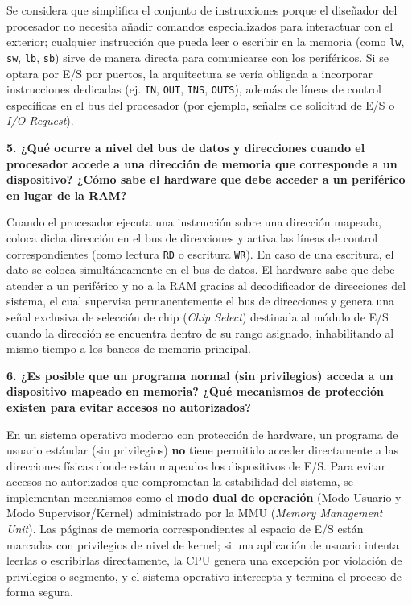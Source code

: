 \documentclass[11pt,a4paper]{article}
\begin{document}
\vspace{0.5cm}
Se considera que simplifica el conjunto de instrucciones porque el diseñador del procesador no necesita añadir comandos especializados para interactuar con el exterior; cualquier instrucción que pueda leer o escribir en la memoria (como \texttt{lw}, \texttt{sw}, \texttt{lb}, \texttt{sb}) sirve de manera directa para comunicarse con los periféricos. Si se optara por E/S por puertos, la arquitectura se vería obligada a incorporar instrucciones dedicadas (ej. \texttt{IN}, \texttt{OUT}, \texttt{INS}, \texttt{OUTS}), además de líneas de control específicas en el bus del procesador (por ejemplo, señales de solicitud de E/S o \textit{I/O Request}).

\vspace{0.4cm}
\noindent\textbf{5. ¿Qué ocurre a nivel del bus de datos y direcciones cuando el procesador accede a una dirección de memoria que corresponde a un dispositivo? ¿Cómo sabe el hardware que debe acceder a un periférico en lugar de la RAM?}

\vspace{0.5cm}
Cuando el procesador ejecuta una instrucción sobre una dirección mapeada, coloca dicha dirección en el bus de direcciones y activa las líneas de control correspondientes (como lectura \texttt{RD} o escritura \texttt{WR}). En caso de una escritura, el dato se coloca simultáneamente en el bus de datos. El hardware sabe que debe atender a un periférico y no a la RAM gracias al decodificador de direcciones del sistema, el cual supervisa permanentemente el bus de direcciones y genera una señal exclusiva de selección de chip (\textit{Chip Select}) destinada al módulo de E/S cuando la dirección se encuentra dentro de su rango asignado, inhabilitando al mismo tiempo a los bancos de memoria principal.

\vspace{0.4cm}
\noindent\textbf{6. ¿Es posible que un programa normal (sin privilegios) acceda a un dispositivo mapeado en memoria? ¿Qué mecanismos de protección existen para evitar accesos no autorizados?}

\vspace{0.5cm}
En un sistema operativo moderno con protección de hardware, un programa de usuario estándar (sin privilegios) \textbf{no} tiene permitido acceder directamente a las direcciones físicas donde están mapeados los dispositivos de E/S. Para evitar accesos no autorizados que comprometan la estabilidad del sistema, se implementan mecanismos como el \textbf{modo dual de operación} (Modo Usuario y Modo Supervisor/Kernel) administrado por la MMU (\textit{Memory Management Unit}). Las páginas de memoria correspondientes al espacio de E/S están marcadas con privilegios de nivel de kernel; si una aplicación de usuario intenta leerlas o escribirlas directamente, la CPU genera una excepción por violación de privilegios o segmento, y el sistema operativo intercepta y termina el proceso de forma segura.
\end{document}
